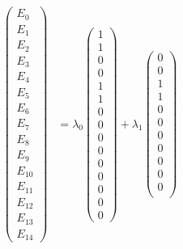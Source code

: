   \begin{align*}
    \begin{pmatrix}
      E_0 \\
      E_1 \\
      E_2 \\
      E_3 \\
      E_4 \\
      E_5 \\
      E_6 \\
      E_7 \\
      E_8 \\
      E_9 \\
      E_{10} \\
      E_{11} \\
      E_{12} \\
      E_{13} \\
      E_{14}
    \end{pmatrix}
      &= \lambda_0
           \begin{pmatrix}
             1 \\
             1 \\
             0 \\
             0 \\
             1 \\
             1 \\
             0 \\
             0 \\
             0 \\
             0 \\
             0 \\
             0 \\
             0 \\
             0 \\
             0
           \end{pmatrix}
         + \lambda_1
           \begin{pmatrix}
             0 \\
             0 \\
             1 \\
             1 \\
             0 \\
             0 \\
             0 \\
             0 \\
             0 \\
             0 \\
             0 \\

\end{pmatrix}
\end{align*}
